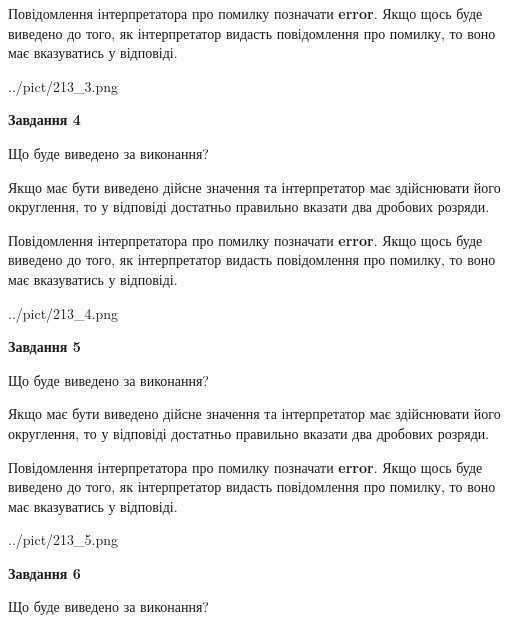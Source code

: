 \documentclass[12pt, ukrainian]{article}
\begin{document}
{\begin {Large}
Повідомлення інтерпретатора про помилку позначати \textbf{error}.
Якщо щось буде виведено до того, як інтерпретатор видасть повідомлення про помилку, 
то воно має вказуватись у відповіді. \par

\begin{center}
	{../pict/213_3.png}
\end{center}
\newpage

{\begin {center}\textbf{Завдання 4}\end {center}}\par
Що буде виведено за виконання? \par

Якщо має бути виведено дійсне значення та інтерпретатор має здійснювати його округлення, 
то у відповіді достатньо правильно вказати два дробових розряди.

Повідомлення інтерпретатора про помилку позначати \textbf{error}.
Якщо щось буде виведено до того, як інтерпретатор видасть повідомлення про помилку, 
то воно має вказуватись у відповіді. \par

\begin{center}
	{../pict/213_4.png}
\end{center}
\newpage

{\begin {center}\textbf{Завдання 5}\end {center}}\par
Що буде виведено за виконання? \par

Якщо має бути виведено дійсне значення та інтерпретатор має здійснювати його округлення, 
то у відповіді достатньо правильно вказати два дробових розряди.

Повідомлення інтерпретатора про помилку позначати \textbf{error}.
Якщо щось буде виведено до того, як інтерпретатор видасть повідомлення про помилку, 
то воно має вказуватись у відповіді. \par

\begin{center}
	{../pict/213_5.png}
\end{center}
\newpage

{\begin {center}\textbf{Завдання 6}\end {center}}\par
Що буде виведено за виконання? \par


\end{Large}}
\end{document}
